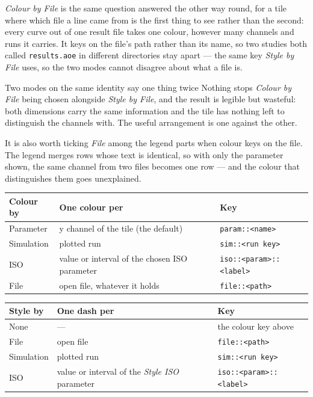\documentclass[11pt,a4paper,oneside]{report}
\newcommand{\code}[1]{\texttt{#1}}
\begin{document}
\emph{Colour by File} is the same question answered the other way round, for a
tile where which file a line came from is the first thing to see rather than
the second: every curve out of one result file takes one colour, however many
channels and runs it carries. It keys on the file's path rather than its name,
so two studies both called \code{results.aoe} in different directories stay
apart --- the same key \emph{Style by File} uses, so the two modes cannot
disagree about what a file is.

\begin{aoenote}{Two modes on the same identity say one thing twice}
Nothing stops \emph{Colour by File} being chosen alongside \emph{Style by
File}, and the result is legible but wasteful: both dimensions carry the same
information and the tile has nothing left to distinguish the channels with.
The useful arrangement is one against the other.

It is also worth ticking \emph{File} among the legend parts when colour keys
on the file. The legend merges rows whose text is identical, so with only the
parameter shown, the same channel from two files becomes one row --- and the
colour that distinguishes them goes unexplained.
\end{aoenote}

\begin{center}
\small
\begin{tabular}{@{}lp{}p{}@{}}
\toprule
\textbf{Colour by} & \textbf{One colour per} & \textbf{Key} \\
\midrule
Parameter & y channel of the tile (the default) & \code{param::<name>} \\
Simulation & plotted run & \code{sim::<run key>} \\
ISO & value or interval of the chosen ISO parameter & \code{iso::<param>::<label>} \\
File & open file, whatever it holds & \code{file::<path>} \\
\bottomrule
\end{tabular}

\vspace{8pt}

\begin{tabular}{@{}lp{}p{}@{}}
\toprule
\textbf{Style by} & \textbf{One dash per} & \textbf{Key} \\
\midrule
None & --- & the colour key above \\
File & open file & \code{file::<path>} \\
Simulation & plotted run & \code{sim::<run key>} \\
ISO & value or interval of the \emph{Style ISO} parameter & \code{iso::<param>::<label>} \\
\bottomrule
\end{tabular}
\end{center}
\end{document}
